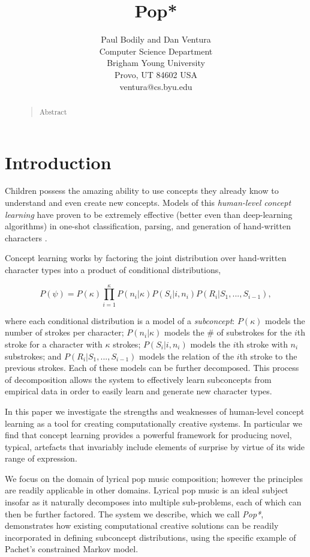 \documentclass[letterpaper]{article}
\title{Pop*}
\author{Paul Bodily and Dan Ventura\\
Computer Science Department\\
Brigham Young University\\
Provo, UT 84602  USA\\
ventura@cs.byu.edu\\
}
\begin{document}
 
\maketitle
\begin{abstract}
\begin{quote}
Abstract
\end{quote}
\end{abstract}

\section{Introduction}

Children possess the amazing ability to use concepts they already know to understand and even create new concepts. Models of this \textit{human-level concept learning} have proven to be extremely effective (better even than deep-learning algorithms) in one-shot classification, parsing, and generation of hand-written characters \cite{lake2015human}.

Concept learning works by factoring the joint distribution over hand-written character types into a product of conditional distributions,

\[ P(\psi) = P(\kappa) \prod_{i=1}^{\kappa} P(n_i|\kappa)P(S_i|i,n_i)P(R_i|S_1, ..., S_{i-1}), \]

\noindent where each conditional distribution is a model of a \textit{subconcept}: \( P(\kappa) \) models the number of strokes per character; \( P(n_i|\kappa) \) models the \# of substrokes for the $i$th stroke for a character with $\kappa$ strokes; \( P(S_i|i,n_i) \) models the $i$th stroke with $n_i$ substrokes; and \( P(R_i|S_1, ..., S_{i-1}) \) models the relation of the $i$th stroke to the previous strokes. Each of these models can be further decomposed. This process of decomposition allows the system to effectively learn subconcepts from empirical data in order to easily learn and generate new character types.

In this paper we investigate the strengths and weaknesses of human-level concept learning as a tool for creating computationally creative systems. In particular we find that concept learning provides a powerful framework for producing novel, typical, artefacts that invariably include elements of surprise by virtue of its wide range of expression.

We focus on the domain of lyrical pop music composition; however the principles are readily applicable in other domains. Lyrical pop music is an ideal subject insofar as it naturally decomposes into multiple sub-problems, each of which can then be further factored. The system we describe, which we call \textit{Pop*}, demonstrates how existing computational creative solutions can be readily incorporated in defining subconcept distributions, using the specific example of Pachet's constrained Markov model.
\end{document}
